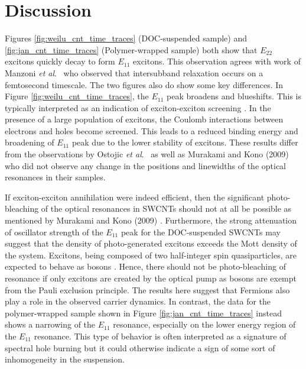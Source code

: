 \section{Discussion }


Figures \ref{fig:weilu_cnt_time_traces} (DOC-suspended sample) and \ref{fig:jan_cnt_time_traces} (Polymer-wrapped sample) both show that $E_{22}$ excitons quickly decay to form $E_{11}$ excitons. This observation agrees with work of Manzoni \textit{et al}.\ \cite{manzoni2005intersubband} who observed that intersubband relaxation occurs on a femtosecond timescale. The two figures also do show some key differences. In Figure \ref{fig:weilu_cnt_time_traces}, the $E_{11}$ peak broadens and blueshifts. This is typically interpreted as an indication of exciton-exciton screening \cite{shah1996ultrafast}. In the presence of a large population of excitons, the Coulomb interactions between electrons and holes become screened. This leads to a reduced binding energy and broadening of $E_{11}$ peak due to the lower stability of excitons. These results differ from the observations by Ostojic \textit{et al}.\ \cite{ostojic2005stability} as well as Murakami and Kono (2009) \cite{murakami2009existence} who did not observe any change in the positions and linewidths of the optical resonances in their samples.

If exciton-exciton annihilation were indeed efficient, then the significant photo-bleaching of the optical resonances in SWCNTs should not at all be possible as mentioned by Murakami and Kono (2009) \cite{murakami2009existence}. Furthermore, the strong attenuation of oscillator strength of the $E_{11}$ peak for the DOC-suspended SWCNTs may suggest that the density of photo-generated excitons exceeds the Mott density of the system. Excitons, being composed of two half-integer spin quasiparticles, are expected to behave as bosons \cite{Ashcroft, laikhtman2007excitons}. Hence, there should not be photo-bleaching of resonance if only excitons are created by the optical pump as bosons are exempt from the Pauli exclusion principle. The results here suggest that Fermions also play a role in the observed carrier dynamics. In contrast, the data for the polymer-wrapped sample shown in Figure \ref{fig:jan_cnt_time_traces} instead shows a narrowing of the $E_{11}$ resonance, especially on the lower energy region of the $E_{11}$ resonance. This type of behavior is often interpreted as a signature of spectral hole burning but it could otherwise indicate a sign of some sort of inhomogeneity in the suspension.


